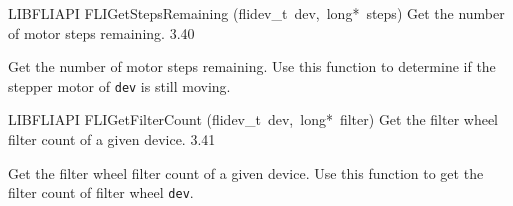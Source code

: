 \documentclass{article}
\begin{document}
\begin{cxxentry}
\begin{cxxfunction}
\begin{cxxdoc}
\end{cxxdoc}
\end{cxxfunction}
\begin{cxxfunction}
{LIBFLIAPI}
        {FLIGetStepsRemaining}
        {(flidev\_t\ dev,\ long*\ steps)}
        { Get the number of motor steps remaining.}
        {3.40}
\begin{cxxdoc}

Get the number of motor steps remaining. Use this function
to determine if the stepper motor of \texttt{dev} is still moving.


\end{cxxdoc}
\end{cxxfunction}
\begin{cxxfunction}
{LIBFLIAPI}
        {FLIGetFilterCount}
        {(flidev\_t\ dev,\ long*\ filter)}
        { Get the filter wheel filter count of a given device.}
        {3.41}
\begin{cxxdoc}

Get the filter wheel filter count of a given device.  Use this
function to get the filter count of filter wheel \texttt{dev}.



\end{cxxdoc}
\end{cxxfunction}
\end{cxxentry}
\end{document}
